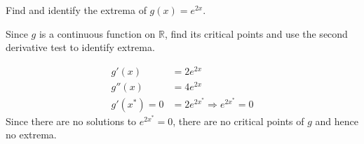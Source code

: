 \documentclass{ximera}
\author{Emma Smith Zbarsky}
\begin{document}
\begin{exercise}

Find and identify the extrema of $g(x) = e^{2x}$.


\begin{hint}
Since $g$ is a continuous function on $\mathbb{R}$, find its critical
points and use the second derivative test to identify extrema.
\end{hint}


\begin{hint}
\begin{align*}
g'(x) &= 2e^{2x} \\
g''(x) &= 4e^{2x} \\
g'(x^*)=0 &= 2e^{2x^*} \Rightarrow e^{2x^*} = 0
\end{align*} Since there are no solutions to $e^{2x^*}=0$, there are
no critical points of $g$ and hence no extrema.
\end{hint}


\begin{multipleChoice}
\end{multipleChoice}

\end{exercise}
\end{document}
